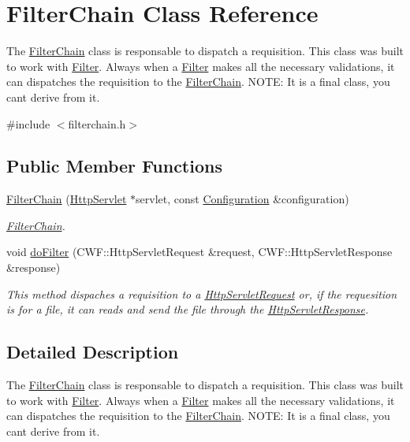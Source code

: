 \hypertarget{class_filter_chain}{}\section{Filter\+Chain Class Reference}
\label{class_filter_chain}


The \hyperlink{class_filter_chain}{Filter\+Chain} class is responsable to dispatch a requisition. This class was built to work with \hyperlink{class_filter}{Filter}. Always when a \hyperlink{class_filter}{Filter} makes all the necessary validations, it can dispatches the requisition to the \hyperlink{class_filter_chain}{Filter\+Chain}. N\+O\+TE\+: It is a final class, you can\textquotesingle{}t derive from it.  




{\ttfamily \#include $<$filterchain.\+h$>$}

\subsection*{Public Member Functions}
\begin{DoxyCompactItemize}
\item 
\hyperlink{class_filter_chain_aa4e3e6a2aa98f1cb29c3b8eacfe36dde}{Filter\+Chain} (\hyperlink{class_http_servlet}{Http\+Servlet} $\ast$servlet, const \hyperlink{class_configuration}{Configuration} \&configuration)
\begin{DoxyCompactList}\small\item\em \hyperlink{class_filter_chain}{Filter\+Chain}. \end{DoxyCompactList}\item 
void \hyperlink{class_filter_chain_a2792dc5418eeb0914af046d78f679d51}{do\+Filter} (C\+W\+F\+::\+Http\+Servlet\+Request \&request, C\+W\+F\+::\+Http\+Servlet\+Response \&response)
\begin{DoxyCompactList}\small\item\em This method dispaches a requisition to a \hyperlink{class_http_servlet_request}{Http\+Servlet\+Request} or, if the requesition is for a file, it can reads and send the file through the \hyperlink{class_http_servlet_response}{Http\+Servlet\+Response}. \end{DoxyCompactList}\end{DoxyCompactItemize}


\subsection{Detailed Description}
The \hyperlink{class_filter_chain}{Filter\+Chain} class is responsable to dispatch a requisition. This class was built to work with \hyperlink{class_filter}{Filter}. Always when a \hyperlink{class_filter}{Filter} makes all the necessary validations, it can dispatches the requisition to the \hyperlink{class_filter_chain}{Filter\+Chain}. N\+O\+TE\+: It is a final class, you can\textquotesingle{}t derive from it. 

